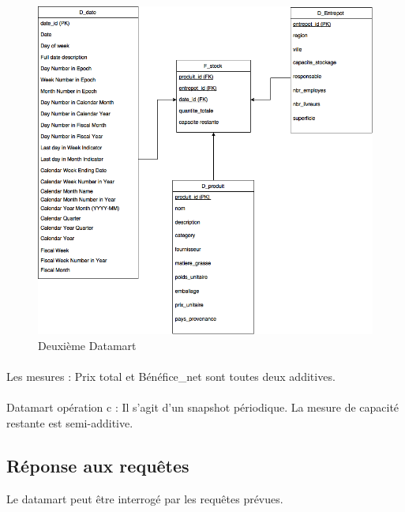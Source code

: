     \begin{figure}[h]
        \centerline{\includegraphics[scale=0.6]{EtoileDM2.png}}
        \caption{Deuxième Datamart}
        \label{fig:UML}
    \end{figure}

\paragraph{} Les mesures : Prix total et Bénéfice\_net sont toutes deux additives.

\paragraph{} 
Datamart opération c :
Il s’agit d’un snapshot périodique.
La mesure de capacité restante est semi-additive.

\subsection{Réponse aux requêtes} 
Le datamart peut être interrogé par les requêtes prévues.
